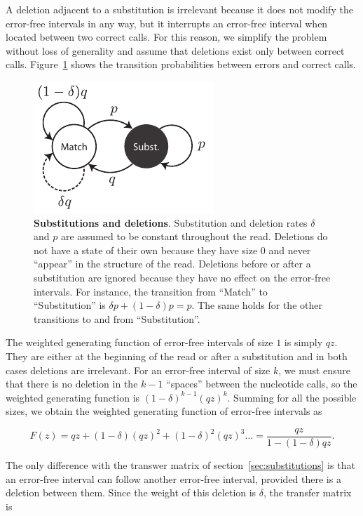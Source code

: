 \documentclass{article}
\begin{document}
A deletion adjacent to a substitution is irrelevant because it does not
modify the error-free intervals in any way, but it interrupts an
error-free interval when located between two correct calls. For this
reason, we simplify the problem without loss of generality and assume that
deletions exist only between correct calls. Figure~\ref{fig:deletions}
shows the transition probabilities between errors and correct calls.

\begin{figure}[h]
\centering
\includegraphics[scale=0.9]{deletions.pdf}
\caption{\textbf{Substitutions and deletions}. 
Substitution and deletion rates $\delta$ and $p$ are assumed to be
constant throughout the read. Deletions do not have a state of their own
because they have size $0$ and never ``appear'' in the structure of the
read. Deletions before or after a substitution are ignored because they
have no effect on the error-free intervals. For instance, the transition
from ``Match'' to ``Substitution'' is $\delta p + (1-\delta)p = p$. The
same holds for the other transitions to and from ``Substitution''.}
\label{fig:deletions}
\end{figure}

The weighted generating function of error-free intervals of size $1$ is
simply $qz$. They are either at the beginning of the read or after a
substitution and in both cases deletions are irrelevant. For an error-free
interval of size $k$, we must ensure that there is no deletion in the
$k-1$ ``spaces'' between the nucleotide calls, so the weighted generating
function is $(1-\delta)^{k-1}(qz)^k$. Summing for all the possible sizes,
we obtain the weighted generating function of error-free intervals as

\begin{equation}
\label{eq:Fdel}
F(z) = qz + (1-\delta)(qz)^2 + (1-\delta)^2(qz)^3 \ldots =
\frac{qz}{1-(1-\delta)qz}.
\end{equation}

The only difference with the transwer matrix of
section~\ref{sec:substitutions} is that an error-free interval can follow
another error-free interval, provided there is a deletion between them.
Since the weight of this deletion is $\delta$, the transfer matrix is
\end{document}
